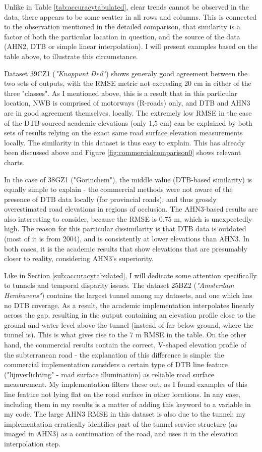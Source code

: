 Unlike in Table \ref{tab:accuracytabulated}, clear trends cannot be observed in the data, there appears to be some scatter in all rows and columns. This is connected to the observation mentioned in the detailed comparison, that similarity is a factor of both the particular location in question, and the source of the data (AHN2, DTB or simple linear interpolation). I will present examples based on the table above, to illustrate this circumstance.

Dataset 39CZ1 (\textit{"Knoppunt Deil"}) shows generaly good agreement between the two sets of outputs, with the RMSE metric not exceeding 20 cm in either of the three "classes". As I mentioned above, this is a result that in this particular location, NWB is comprised of motorways (R-roads) only, and DTB and AHN3 are in good agreement themselves, locally. The extremely low RMSE in the case of the DTB-sourced academic elevations (only 1,5 cm) can be explained by both sets of results relying on the exact same road surface elevation measurements locally. The similarity in this dataset is thus easy to explain. This has already been discussed above and Figure \ref{fig:commercialcomparison0} shows relevant charts.

In the case of 38GZ1 ("Gorinchem"), the middle value (DTB-based similarity) is equally simple to explain - the commercial methods were not aware of the presence of DTB data locally (for provincial roads), and thus grossly overestimated road elevations in regions of occlusion. The AHN3-based results are also interesting to consider, because the RMSE is 0.75 m, which is unexpectedly high. The reason for this particular dissimilarity is that DTB data is outdated (most of it is from 2004), and is consistently at lower elevations than AHN3. In both cases, it is the academic results that show elevations that are presumably closer to reality, considering AHN3's superiority.

Like in Section \ref{sub:accuracytabulated}, I will dedicate some attention specifically to tunnels and temporal disparity issues. The dataset 25BZ2 (\textit{"Amsterdam Hemhavens"}) contains the largest tunnel among my datasets, and one which has no DTB coverage. As a result, the academic implementation interpolates linearly across the gap, resulting in the output containing an elevation profile close to the ground and water level above the tunnel (instead of far below ground, where the tunnel is). This is what gives rise to the 7 m RMSE in the table. On the other hand, the commercial results contain the correct, V-shaped elevation profile of the subterranean road - the explanation of this difference is simple: the commercial implementation considers a certain type of DTB line feature ("lijnverlichting" - road surface illumination) as reliable road surface measurement. My implementation filters these out, as I found examples of this line feature not lying flat on the road surface in other locations. In any case, including them in my results is a matter of adding this keyword to a variable in my code. The large AHN3 RMSE in this dataset is also due to the tunnel; my implementation erratically identifies part of the tunnel service structure (as imaged in AHN3) as a continuation of the road, and uses it in the elevation interpolation step.

